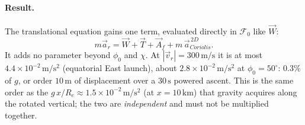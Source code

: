 \paragraph{Result.} The translational equation gains one term, evaluated directly in
$\mathcal{F}_0$ like $\vec{W}$:
\begin{equation}
    m\vec{a}_r = \vec{W} +\vec{T} + \vec{A}_f + m\,\vec{a}_{Coriolis}^{\,2D}.
\end{equation}
It adds no parameter beyond $\phi_0$ and $\chi$. At $|\vec{v}_r|=300\,\mathrm{m/s}$ it is at most
$4.4\times10^{-2}\,\mathrm{m/s^2}$ (equatorial East launch), about $2.8\times10^{-2}\,\mathrm{m/s^2}$
at $\phi_0=50^\circ$: $0.3\%$ of $g$, or order $10\,\mathrm{m}$ of displacement over a $30\,
\mathrm{s}$ powered ascent. This is the same order as the $g\,x/R_e\approx1.5\times10^{-2}\,
\mathrm{m/s^2}$ (at $x=10\,\mathrm{km}$) that gravity acquires along the rotated vertical; the two
are \emph{independent} and must not be multiplied together.



